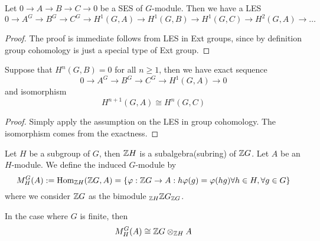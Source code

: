 \medskip 

\begin{thm} 
    Let $0\to A \to B\to C \to 0$ be a SES of $G$-module. Then we have a LES 
    \[0 \to A^G \to B^G \to C^G \to H^1(G,A) \to H^1(G,B) \to H^1(G,C) \to H^2(G,A) \to \dots\]
\end{thm}
\begin{proof}
    The proof is immediate follows from LES in Ext groups, since by definition group cohomology is just a special type of Ext group.
\end{proof}

\begin{cor}
    Suppose that $H^n(G,B)=0$ for all $n\geq 1$, then we have exact sequence
    \[0 \to A^G \to B^G \to C^G \to H^1(G,A)\to 0\]
    and isomorphism 
    \[H^{n+1}(G,A) \cong H^n(G,C)\]
\end{cor}
\begin{proof}
    Simply apply the assumption on the LES in group cohomology. The isomorphism comes from the exactness.
\end{proof}

\begin{defn} 
    Let $H$ be a subgroup of $G$, then ${\mathbb Z} H$ is a subalgebra(subring) of ${\mathbb Z} G$. Let $A$ be an $H$-module. We define the induced $G$-module by
    \[M_H^G(A) := \operatorname{Hom}_{{\mathbb Z} H} ({\mathbb Z} G, A) = \left\{\varphi: {\mathbb Z} G \to A: h\varphi(g) = \varphi(hg) \forall h\in H, \forall g\in G\right\}\]
    where we consider ${\mathbb Z} G$ as the bimodule $_{{\mathbb Z} H} {\mathbb Z} G_{{\mathbb Z} G}$.
\end{defn}

\medskip

\begin{re}
    In the case where $G$ is finite, then 
    \[M^G_H(A) \cong {\mathbb Z} G \otimes_{{\mathbb Z} H} A\]
\end{re}